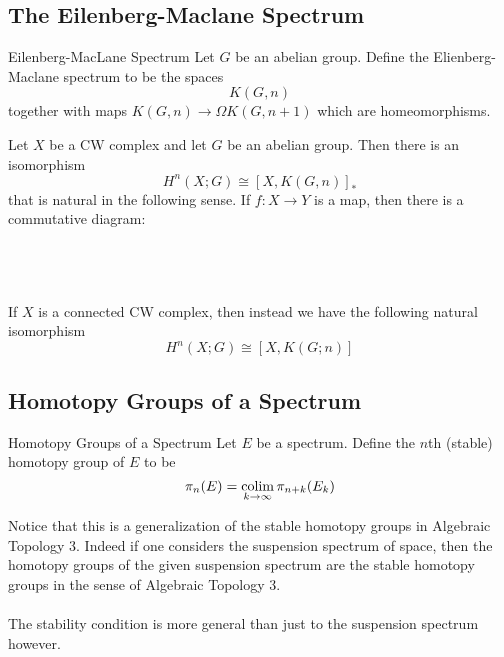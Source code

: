 \documentclass[a4paper]{article}
\begin{document}
\subsection{The Eilenberg-Maclane Spectrum}
\begin{defn}{Eilenberg-MacLane Spectrum}{} Let $G$ be an abelian group. Define the Elienberg-Maclane spectrum to be the spaces $$K(G,n)$$ together with maps $K(G,n)\to\Omega K(G,n+1)$ which are homeomorphisms. 
\end{defn}

\begin{thm}{}{} Let $X$ be a CW complex and let $G$ be an abelian group. Then there is an isomorphism $$H^n(X;G)\cong[X,K(G,n)]_\ast$$ that is natural in the following sense. If $f:X\to Y$ is a map, then there is a commutative diagram: \\~\\
\\~\\
\end{thm}

If $X$ is a connected CW complex, then instead we have the following natural isomorphism $$H^n(X;G)\cong[X,K(G;n)]$$

\subsection{Homotopy Groups of a Spectrum}
\begin{defn}{Homotopy Groups of a Spectrum}{} Let $E$ be a spectrum. Define the $n$th (stable) homotopy group of $E$ to be $$\pi_n(E)=\operatorname*{colim}_{k\to\infty}\pi_{n+k}(E_k)$$
\end{defn}

Notice that this is a generalization of the stable homotopy groups in Algebraic Topology 3. Indeed if one considers the suspension spectrum of space, then the homotopy groups of the given suspension spectrum are the stable homotopy groups in the sense of Algebraic Topology 3. \\~\\

The stability condition is more general than just to the suspension spectrum however. 
\end{document}
